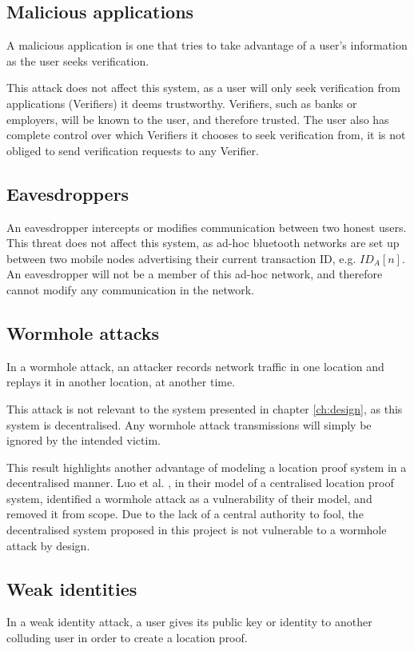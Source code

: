 \subsection{Malicious applications}
A malicious application is one that tries to take advantage of a user's information as the user seeks verification.

This attack does not affect this system, as a user will only seek verification from applications (Verifiers) it deems trustworthy. Verifiers, such as banks or employers, will be known to the user, and therefore trusted. The user also has complete control over which Verifiers it chooses to seek verification from, it is not obliged to send verification requests to any Verifier.

\subsection{Eavesdroppers}
An eavesdropper intercepts or modifies communication between two honest users. This threat does not affect this system, as ad-hoc bluetooth networks are set up between two mobile nodes advertising their current transaction ID, e.g. $ID_A[n]$. An eavesdropper will not be a member of this ad-hoc network, and therefore cannot modify any communication in the network.

\subsection{Wormhole attacks}
In a wormhole attack, an attacker records network traffic in one location and replays it in another location, at another time.

This attack is not relevant to the system presented in chapter \ref{ch:design}, as this system is decentralised. Any wormhole attack transmissions will simply be ignored by the intended victim.

This result highlights another advantage of modeling a location proof system in a decentralised manner. Luo et al. \cite{luo}, in their model of a centralised location proof system, identified a wormhole attack as a vulnerability of their model, and removed it from scope. Due to the lack of a central authority to fool, the decentralised system proposed in this project is not vulnerable to a wormhole attack by design.

\subsection{Weak identities}
In a weak identity attack, a user gives its public key or identity to another colluding user in order to create a location proof.


